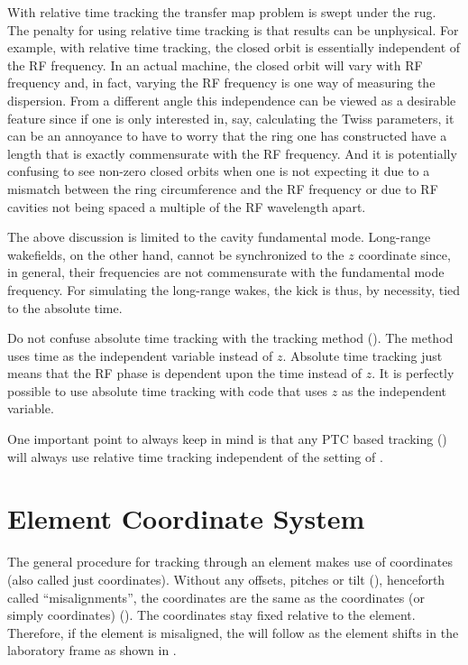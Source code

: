 With relative time tracking the transfer map problem is swept under the rug. The penalty for using
relative time tracking is that results can be unphysical. For example, with relative time tracking,
the closed orbit is essentially independent of the RF frequency. In an actual machine, the closed orbit
will vary with RF frequency and, in fact, varying the RF frequency is one way of measuring
the dispersion. From a different angle this independence can be
viewed as a desirable feature since if one is only interested in, say, calculating the Twiss
parameters, it can be an annoyance to have to worry that the ring one has constructed have a length
that is exactly commensurate with the RF frequency. And it is potentially confusing to see non-zero
closed orbits when one is not expecting it due to a mismatch between the ring circumference and the
RF frequency or due to RF cavities not being spaced a multiple of the RF wavelength apart.

The above discussion is limited to the cavity fundamental mode. Long-range wakefields, on the
other hand, cannot be synchronized to the $z$ coordinate since, in general, their frequencies are
not commensurate with the fundamental mode frequency. For simulating the long-range wakes, the kick
is thus, by necessity, tied to the absolute time.

Do not confuse absolute time tracking with the  tracking method
(). The  method uses time as the independent variable instead of
$z$. Absolute time tracking just means that the RF phase is dependent upon the time instead of
$z$. It is perfectly possible to use absolute time tracking with code that uses $z$ as the
independent variable.

One important point to always keep in mind is that any PTC based tracking () will
always use relative time tracking independent of the setting of .

\section{Element Coordinate System}
\label{s:ele.coords}

The general procedure for tracking through an element makes use of 
coordinates (also called just  coordinates). Without any offsets, pitches or tilt
(), henceforth called ``misalignments'', the  coordinates are the same as
the  coordinates (or simply  coordinates)
(). The  coordinates stay fixed relative to the element. Therefore, if the
element is misaligned, the  will follow as the element shifts in the
laboratory frame as shown in .

